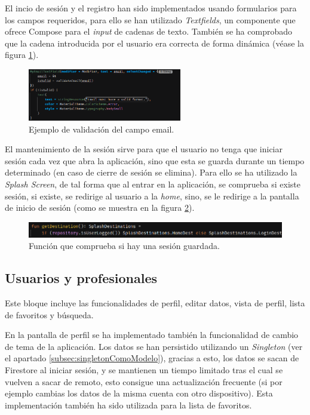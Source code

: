 El incio de sesión y el registro han sido implementados usando formularios para los campos requeridos, para ello se han utilizado \textit{Textfields}, un componente que ofrece Compose para el \textit{input} de cadenas de texto. También se ha comprobado que la cadena introducida por el usuario era correcta de forma dinámica (véase la figura \ref{fig:textfield}). 
\begin{figure}[h]
    \centering
    \includegraphics[width = 0.6\textwidth]{Imagenes/Fuentes/textfield.png}
    \caption{Ejemplo de validación del campo email.}
    \label{fig:textfield}
\end{figure}

El mantenimiento de la sesión sirve para que el usuario no tenga que iniciar sesión cada vez que abra la aplicación, sino que esta se guarda durante un tiempo determinado (en caso de cierre de sesión se elimina). Para ello se ha utilizado la \textit{Splash Screen}, de tal forma que al entrar en la aplicación, se comprueba si existe sesión, si existe, se redirige al usuario a la \textit{home}, sino, se le redirige a la pantalla de inicio de sesión (como se muestra en la figura \ref{fig:splashDest}). 
\begin{figure}[h]
    \centering
    \includegraphics[width = 1\textwidth]{Imagenes/Fuentes/splashDest.png}
    \caption{Función que comprueba si hay una sesión guardada.}
    \label{fig:splashDest}
\end{figure}

\subsection{Usuarios y profesionales} 
Este bloque incluye las funcionalidades de perfil, editar datos, vista de perfil, lista de favoritos y búsqueda.

En la pantalla de perfil se ha implementado también la funcionalidad de cambio de tema de la aplicación. Los datos se han persistido utilizando un \textit{Singleton} (ver el apartado \ref{subsec:singletonComoModelo}), gracias a esto, los datos se sacan de Firestore al iniciar sesión, y se mantienen un tiempo limitado tras el cual se vuelven a sacar de remoto, esto consigue una actualización frecuente (si por ejemplo cambias los datos de la misma cuenta con otro dispositivo). Esta implementación también ha sido utilizada para la lista de favoritos. 

